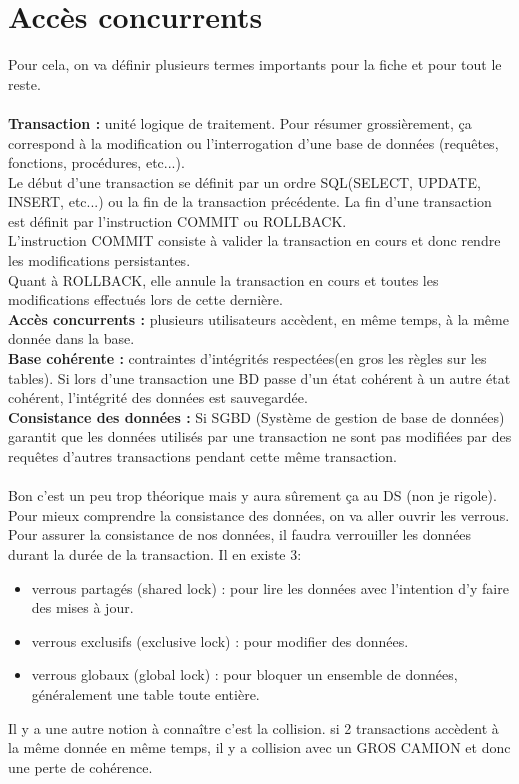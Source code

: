 \documentclass{report}
\begin{document}
\section{Accès concurrents}
Pour cela, on va définir plusieurs termes importants pour la fiche et pour tout le reste.\\\\
\textbf{Transaction :} unité logique de traitement. Pour résumer grossièrement, ça correspond à la modification ou l'interrogation d'une base de données (requêtes, fonctions, procédures, etc...).\\
Le début d'une transaction se définit par un ordre SQL(SELECT, UPDATE, INSERT, etc...) ou la fin de la transaction précédente. La fin d'une transaction est définit par l'instruction COMMIT ou ROLLBACK.\\
L'instruction COMMIT consiste à valider la transaction en cours et donc rendre les modifications persistantes.\\
Quant à ROLLBACK, elle annule la transaction en cours et toutes les modifications effectués lors de cette dernière.\\
\noindent\textbf{Accès concurrents :} plusieurs utilisateurs accèdent, en même temps, à la même donnée dans la base.\\
\noindent\textbf{Base cohérente :} contraintes d'intégrités respectées(en gros les règles sur les tables). Si lors d'une transaction une BD passe d'un état cohérent à un autre état cohérent, l'intégrité des données est sauvegardée.\\
\noindent\textbf{Consistance des données :} Si SGBD (Système de gestion de base de données) garantit que les données utilisés par une transaction ne sont pas modifiées par des requêtes d'autres transactions pendant cette même transaction.\\\\
Bon c'est un peu trop théorique mais y aura sûrement ça au DS (non je rigole). Pour mieux comprendre la consistance des données, on va aller ouvrir les verrous.\\
Pour assurer la consistance de nos données, il faudra verrouiller les données durant la durée de la transaction. Il en existe 3:
\begin{itemize}
\item verrous partagés (shared lock) : pour lire les données avec l'intention d'y faire des mises à jour.
\item verrous exclusifs (exclusive lock) : pour modifier des données.
\item verrous globaux (global lock) : pour bloquer un ensemble de données, généralement une table toute entière.
\end{itemize}
Il y a une autre notion à connaître c'est la collision. si 2 transactions accèdent à la même donnée en même temps, il y a collision avec un GROS CAMION et donc une perte de cohérence.\\
\end{document}
